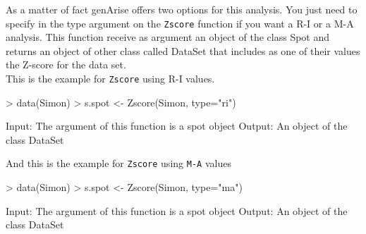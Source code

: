 \documentclass[12pt]{article}
\begin{document}
As a matter of fact genArise offers two options for this analysis. You just need to specify in the type argument on the \texttt{Zscore} function if you want a R-I or a M-A analysis. This function receive as argument an object of the class Spot and returns an object of other class called DataSet that includes as one of their values the Z-score for the data set.\\

This is the example for \texttt{Zscore} using  R-I values.

\begin{Scode}
> data(Simon)
> s.spot <- Zscore(Simon, type="ri")
\end{Scode}

\begin{Soutput}
Input: The argument of this function is a spot object
Output: An object of the class DataSet
\end{Soutput}

And this is the example for \texttt{Zscore} using \texttt{M-A} values

\begin{Scode}
> data(Simon)
> s.spot <- Zscore(Simon, type="ma")
\end{Scode}

\begin{Soutput}
Input: The argument of this function is a spot object
Output: An object of the class DataSet
\end{Soutput}
\end{document}
